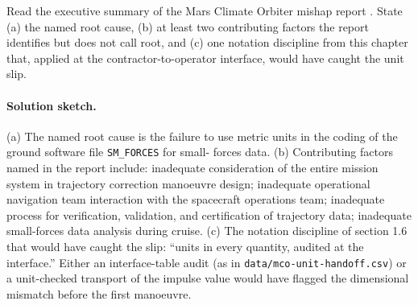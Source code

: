 \begin{exercise}
Read the executive summary of the Mars Climate Orbiter mishap report
\cite{acc:nasa-mco-mib}. State (a) the named root cause, (b) at
least two contributing factors the report identifies but does not
call root, and (c) one notation discipline from this chapter that,
applied at the contractor-to-operator interface, would have caught
the unit slip.

\paragraph{Solution sketch.}
(a) The named root cause is the failure to use metric units in the
coding of the ground software file \texttt{SM\_FORCES} for small-
forces data. (b) Contributing factors named in the report include:
inadequate consideration of the entire mission system in trajectory
correction manoeuvre design; inadequate operational navigation team
interaction with the spacecraft operations team; inadequate process
for verification, validation, and certification of trajectory data;
inadequate small-forces data analysis during cruise. (c) The
notation discipline of section 1.6 that would have caught the slip:
``units in every quantity, audited at the interface.'' Either an
interface-table audit (as in
\texttt{data/mco-unit-handoff.csv}) or a unit-checked transport of
the impulse value would have flagged the dimensional mismatch
before the first manoeuvre.
\end{exercise}

